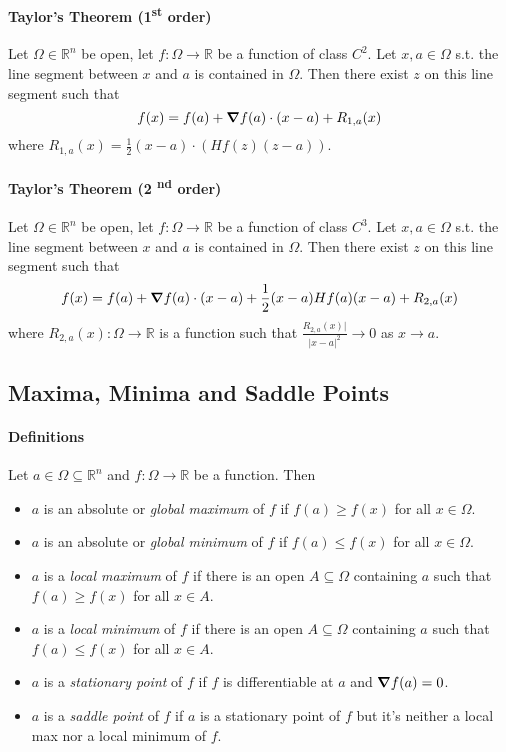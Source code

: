 \paragraph{Taylor's Theorem (1\textsuperscript{st} order)}
Let \(\Omega \in \mathbb R^n\) be open, let \(f:\Omega \to \mathbb R\) be a function
of class \(C^2\). Let \(x, a \in \Omega\) s.t. the line segment between \(x\) and \(a\) is
contained in \(\Omega.\) Then there exist \(z\) on this line segment such that 
\[f(x) = f(a) + \grad f(a) \cdot (x-a) + R_{1,a}(x)\]
where \(R_{1,a}(x) = \frac{1}{2}(x-a) \cdot (Hf(z)(z-a))\).

\paragraph{Taylor's Theorem (2 \textsuperscript{nd} order)}
Let \(\Omega \in \mathbb R^n\) be open, let \(f:\Omega \to \mathbb R\) be a function
of class \(C^3\). Let \(x, a \in \Omega\) s.t. the line segment between \(x\) and \(a\) is
contained in \(\Omega.\) Then there exist \(z\) on this line segment such that 
\[f(x) = f(a) + \grad f(a) \cdot (x-a) + \frac{1}{2}(x-a)Hf(a)(x-a) + R_{2,a}(x)\]
where \(R_{2,a}(x): \Omega \to \mathbb R\) is a function such that 
\(\frac{R_{2,a}(x)|}{|x-a|^2} \to 0\) as \(x \to a\).

\subsection{Maxima, Minima and Saddle Points}
\paragraph{Definitions} Let \(a \in \Omega \subseteq \mathbb R^n\) and \(f: \Omega \to \mathbb R\) be a function. Then
\begin{itemize}
    \item \(a\) is an absolute or \textit{global maximum} of \(f\) if \(f(a) \geq f(x)\) for all \(x \in \Omega\).
    \item \(a\) is an absolute or \textit{global minimum} of \(f\) if \(f(a) \leq f(x)\) for all \(x \in \Omega\).
    \item \(a\) is a \textit{local maximum} of \(f\) if there is an open \(A \subseteq \Omega\) containing \(a\) such that \(f(a) \geq f(x)\) for all \(x \in A\).
    \item \(a\) is a \textit{local minimum} of \(f\) if there is an open \(A \subseteq \Omega\) containing \(a\) such that \(f(a) \leq f(x)\) for all \(x \in A\).
    \item \(a\) is a \textit{stationary point} of \(f\) if \(f\) is differentiable at \(a\) and \(\grad f(a) = 0\).
    \item \(a\) is a \textit{saddle point} of \(f\) if \(a\) is a stationary point of \(f\) but it's neither a local max nor a local minimum of \(f\).
\end{itemize}


